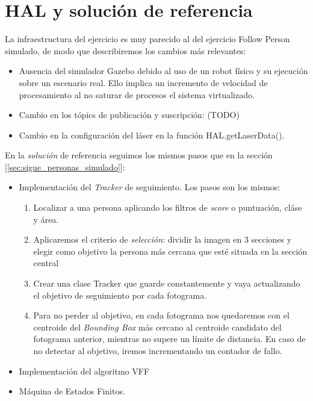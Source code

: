 \section{HAL y solución de referencia}
\label{sec:hal_solucion_real_follow_person}

La infraestructura del ejercicio es muy parecido al del ejercicio Follow Person simulado, de modo que describiremos los cambios más relevantes:

\begin{itemize}
	\item Ausencia del simulador Gazebo debido al uso de un robot físico y su ejecución sobre un escenario real. Ello implica un incremento de velocidad de procesamiento al no saturar de procesos el sistema virtualizado.
	\item Cambio en los tópics de publicación y suscripción: (TODO)
	\item Cambio en la configuración del láser en la función HAL.getLaserData().
\end{itemize}

En la \textit{solución} de referencia seguimos los mismos pasos que en la sección [\ref{sec:sigue_personas_simulado}]:
\begin{itemize}
	\item Implementación del \textit{Tracker} de seguimiento. Los pasos son los mismos:
	\begin{enumerate}
		\item Localizar a una persona aplicando los filtros de \textit{score} o puntuación, cláse y área.
		\item Aplicaremos el criterio de \textit{selección}: dividir la imagen en 3 secciones y elegir como objetivo la persona más cercana que esté situada en la sección central
		\item Crear una clase Tracker que guarde constantemente y vaya actualizando el objetivo de seguimiento por cada fotograma.
		\item Para no perder al objetivo, en cada fotograma nos quedaremos con el centroide del \textit{Bounding Box} más cercano al centroide candidato del fotograma anterior, mientras no supere un límite de distancia. En caso de no detectar al objetivo, iremos incrementando un contador de fallo. 
	\end{enumerate}
	\item Implementación del algoritmo VFF
	\item Máquina de Estados Finitos.
\end{itemize}